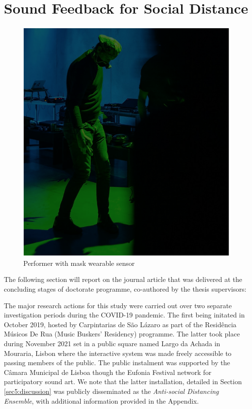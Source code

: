 
\section{Sound Feedback for Social Distance}
\label{case_studies:adse_ess}

\begin{figure}[!h]
\captionsetup{width=1.0\textwidth}
\centering
\includegraphics[width=0.75
\textwidth,keepaspectratio]{Chapters/Figures/adse_ess/CSL_MASK_MICK.png}
{\caption{Performer with mask wearable sensor
}\label{fig:sensor_model}}
\end{figure}

The following section will report on the journal article that was delivered at the concluding stages of doctorate programme, co-authored by the thesis supervisors:


The major research actions for this study were carried out over two separate investigation periods during the COVID-19 pandemic. The first being initated in October 2019, hosted by Carpintarias de São Lázaro as part of the Residência Músicos De Rua (Music Buskers' Residency) programme. The latter took place during November 2021 set in a public square named Largo da Achada in Mouraria, Lisbon where the interactive system was made freely accessible to passing members of the public. The public instalment was supported by the Câmara Municipal de Lisboa though the Eufonia Festival network for participatory sound art. We note that the latter installation, detailed in Section \ref{sec5:discussion} was publicly disseminated as the \textit{Anti-social Distancing Ensemble}, with additional information provided in the Appendix.

